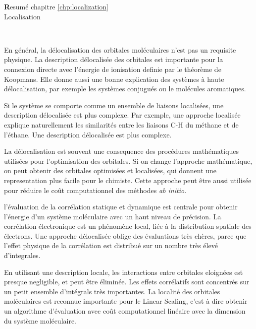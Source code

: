 \pagestyle{empty}
\begin{center}
{\Huge \textbf Resum\'e chapitre \ref{chp:localization} \\ Localisation }
\end{center}
{\ }\\
\vspace{-1mm}

En g\'en\'eral, la d\'elocalisation des orbitales mol\'eculaires n'est pas un
requisite physique. La description d\'elocalis\'ee des orbitales est
importante pour la connexion directe avec l'\'energie de ionisation definie
par le th\'eor\`eme de Koopmans. Elle donne aussi une bonne explication des
syst\`emes \`a haute d\'elocalisation, par exemple les syst\`emes
conjugu\'es ou le mol\'ecules aromatiques.

Si le syst\`eme se comporte comme un ensemble de liaisons localis\'ees, une
description d\'elocalis\'ee est plus complexe. Par exemple, une approche
localis\'ee explique naturellement les similarit\'es entre les liaisons C-H du
m\'ethane et de l'\'ethane. Une description d\'elocalis\'ee est plus complexe.

La d\'elocalisation est souvent une consequence des proc\'edures
math\'ematiques utilis\'ees pour l'optimisation des orbitales. Si on change
l'approche math\'ematique, on peut obtenir des orbitales optimis\'ees et
localis\'ees, qui donnent une representation plus facile pour le chimiste.
Cette approche peut \^etre aussi utilis\'ee pour r\'eduire le co\^ut
computationnel des m\'ethodes \textit{ab initio}.

l'\'evaluation de la corr\'elation statique et dynamique est centrale pour
obtenir l'\'energie d'un syst\`eme mol\'eculaire avec un haut niveau de pr\'ecision.
La corr\'elation \'electronique est un ph\'enom\`ene local, li\'ee \`a la distribution
spatiale des \'electrons. Une approche d\'elocalis\'ee oblige des \'evaluations tr\`es
ch\`eres, parce que l'effet physique de la corr\'elation est distribu\'e sur un
nombre tr\`es \'elev\'e d'integrales.

En utilisant une description locale, les interactions entre orbitales
eloign\'ees est presque negligible, et peut \^etre \'elimin\'ee. Les effets corr\'elatifs
sont concentr\'es sur un petit ensemble d'int\'egrals tr\`es importantes.
La localit\'e des orbitales mol\'eculaires est reconnue importante pour le Linear
Scaling, c'est \`a dire obtenir un algorithme d'\'evaluation avec co\^ut
computationnel lin\'eaire avec la dimension du syst\`eme mol\'eculaire. 

